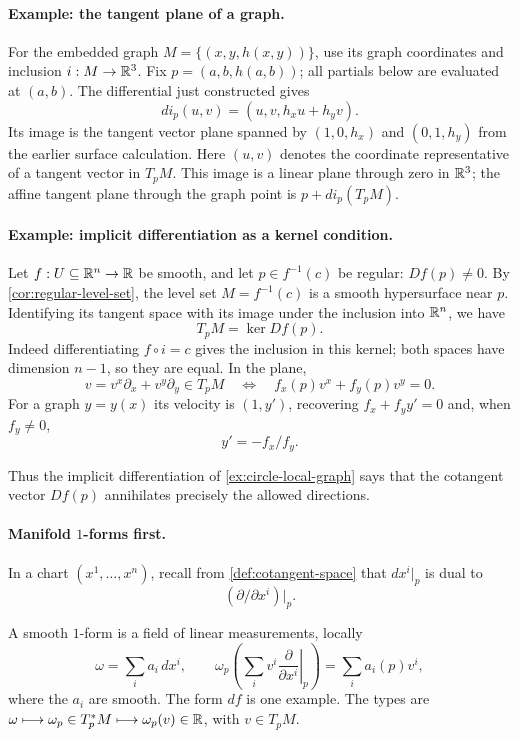 \paragraph{Example: the tangent plane of a graph.}
For the embedded graph $M=\{(x,y,h(x,y))\}$, use its graph coordinates
and inclusion $i:M\to\mathbb{R}^3$. Fix $p=(a,b,h(a,b))$; all partials below
are evaluated at $(a,b)$. The differential just constructed gives
\[
di_p(u,v)=(u,v,h_xu+h_yv).
\]
Its image is the tangent vector plane spanned by $(1,0,h_x)$ and
$(0,1,h_y)$ from the earlier surface calculation. Here $(u,v)$ denotes
the coordinate representative of a tangent vector in $T_pM$.
This image is a linear plane through zero in $\mathbb{R}^3$; the affine tangent
plane through the graph point is $p+di_p(T_pM)$.

\paragraph{Example: implicit differentiation as a kernel condition.}
Let $f:U\subseteq\mathbb{R}^n\to\mathbb{R}$ be smooth, and let $p\in f^{-1}(c)$
be regular: $Df(p)\ne0$. By \cref{cor:regular-level-set}, the level set
$M=f^{-1}(c)$ is a smooth hypersurface near $p$. Identifying its tangent
space with its image under the inclusion into $\mathbb{R}^n$, we have
\[
T_pM=\ker Df(p).
\]
Indeed differentiating $f\circ i=c$ gives the inclusion in this kernel;
both spaces have dimension $n-1$, so they are equal. In the plane,
\[
v=v^x\partial_x+v^y\partial_y\in T_pM
\quad\Longleftrightarrow\quad f_x(p)v^x+f_y(p)v^y=0.
\]
For a graph $y=y(x)$ its velocity is $(1,y')$, recovering
$f_x+f_y y'=0$ and, when $f_y\ne0$,
\[
y'=-f_x/f_y.
\]

Thus the implicit differentiation of \cref{ex:circle-local-graph} says
that the cotangent vector $Df(p)$ annihilates precisely the allowed directions.

\paragraph{Manifold $1$-forms first.}
In a chart $(x^1,\ldots,x^n)$, recall from \cref{def:cotangent-space}
that $dx^i|_p$ is dual to
\[
(\partial/\partial x^i)|_p.
\]

A smooth $1$-form is a field of linear measurements, locally
\[
\omega=\sum_i a_i\,dx^i,\qquad
\omega_p\left(\sum_i v^i\left.\frac{\partial}{\partial x^i}\right|_p\right)
=\sum_i a_i(p)v^i,
\]
where the $a_i$ are smooth. The form $df$ is one example. The types are
$\omega\longmapsto\omega_p\in T_p^*M\longmapsto\omega_p(v)\in\mathbb{R}$,
with $v\in T_pM$.

